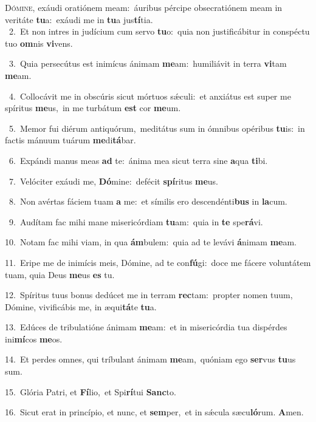 \lettrine{\initial\textcolor{\initialcolor}{D}}{ómine,} exáudi oratiónem meam:~\dagger áuribus pércipe obsecratiónem meam in veritáte \textbf{tu}\-a:~\star exáudi me in \textbf{tu}\-a jus\-\textbf{tí}\-tia.\\
{\numbfont\textcolor{\numbcolor}{~2.}}~Et non intres in judícium cum servo \textbf{tu}\-o:~\star quia non justificábitur in conspéctu tuo \textbf{om}\-nis \textbf{vi}\-vens.\par
{\numbfont\textcolor{\numbcolor}{~3.}}~Quia persecútus est inimícus ánimam \textbf{me}\-am:~\star humiliávit in terra \textbf{vi}\-tam \textbf{me}\-am.\par
{\numbfont\textcolor{\numbcolor}{~4.}}~Collocávit me in obscúris sicut mórtuos sǽculi:~\dagger et anxiátus est super me spíritus \textbf{me}\-us,~\star in me turbátum \textbf{est} cor \textbf{me}\-um.\par
{\numbfont\textcolor{\numbcolor}{~5.}}~Memor fui diérum antiquórum,~\dagger meditátus sum in ómnibus opéribus \textbf{tu}\-is:~\star in factis mánuum tuárum \textbf{me}\-di\-\textbf{tá}\-bar.\par
{\numbfont\textcolor{\numbcolor}{~6.}}~Expándi manus meas \textbf{ad} te:~\star ánima mea sicut terra sine \textbf{a}\-qua \textbf{ti}\-bi.\par
{\numbfont\textcolor{\numbcolor}{~7.}}~Velóciter exáudi me, \textbf{Dó}\-mine:~\star defécit \textbf{spí}\-ritus \textbf{me}\-us.\par
{\numbfont\textcolor{\numbcolor}{~8.}}~Non avértas fáciem tuam \textbf{a} me:~\star et símilis ero descendénti\textbf{bus} in \textbf{la}\-cum.\par
{\numbfont\textcolor{\numbcolor}{~9.}}~Audítam fac mihi mane misericórdiam \textbf{tu}\-am:~\star quia in \textbf{te} spe\-\textbf{rá}\-vi.\par
{\numbfont\textcolor{\numbcolor}{10.}}~Notam fac mihi viam, in qua \textbf{ám}\-bulem:~\star quia ad te levávi \textbf{á}\-nimam \textbf{me}\-am.\par
{\numbfont\textcolor{\numbcolor}{11.}}~Eripe me de inimícis meis, Dómine, ad te con\-\textbf{fú}\-gi:~\star doce me fácere voluntátem tuam, quia Deus \textbf{me}\-us \textbf{es} tu.\par
{\numbfont\textcolor{\numbcolor}{12.}}~Spíritus tuus bonus dedúcet me in terram \textbf{rec}\-tam:~\star propter nomen tuum, Dómine, vivificábis me, in æqui\-\textbf{tá}\-te \textbf{tu}\-a.\par
{\numbfont\textcolor{\numbcolor}{13.}}~Edúces de tribulatióne ánimam \textbf{me}\-am:~\star et in misericórdia tua dispérdes ini\-\textbf{mí}\-cos \textbf{me}\-os.\par
{\numbfont\textcolor{\numbcolor}{14.}}~Et perdes omnes, qui tríbulant ánimam \textbf{me}\-am,~\star quóniam ego \textbf{ser}\-vus \textbf{tu}\-us sum.\par
{\numbfont\textcolor{\numbcolor}{15.}}~Glória Patri, et \textbf{Fí}\-lio,~\star et Spi\-\textbf{rí}\-tui \textbf{Sanc}\-to.\par
{\numbfont\textcolor{\numbcolor}{16.}}~Sicut erat in princípio, et nunc, et \textbf{sem}\-per,~\star et in sǽcula sæcu\-\textbf{ló}\-rum. \textbf{A}\-men.\par
